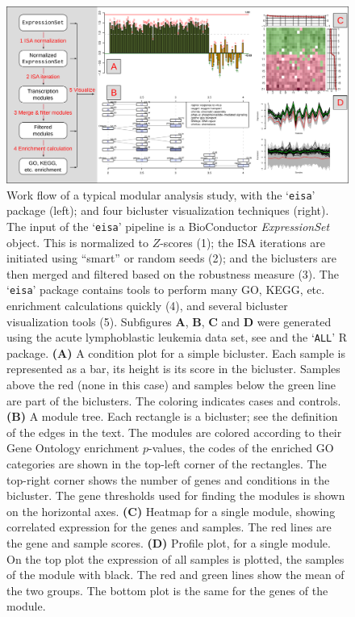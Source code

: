 \documentclass{bioinfo}
\newcommand{\Rpackage}[1]{`\texttt{#1}'}
\newcommand{\Rclass}[1]{\textsl{#1}}
\newcommand{\subfig}[1]{\textbf{#1}}
\begin{document}
\begin{figure}
\centering
\includegraphics[width=\textwidth]{isa2workflow3}
\caption{Work flow of a typical modular analysis study, with the
  \Rpackage{eisa} package (left); and four bicluster visualization
  techniques (right). The input of the \Rpackage{eisa} pipeline is a
  BioConductor \Rclass{ExpressionSet} object. This is normalized to
  $Z$-scores (1); the ISA iterations are initiated using ``smart'' or
  random seeds (2); and the biclusters are then merged and filtered
  based on the robustness measure (3). The \Rpackage{eisa} package
  contains tools to perform many GO, KEGG, etc. enrichment calculations
  quickly (4), and several bicluster visualization tools (5).
  Subfigures \subfig{A}, \subfig{B}, \subfig{C} and \subfig{D} were
generated
  using the acute lymphoblastic leukemia data set, see
  \citep{chiaretti04} and the \Rpackage{ALL} R package.
  \subfig{(A)} A condition plot for a simple bicluster. Each sample is
  represented as a bar, its height is its score in the bicluster.
  Samples above the red (none in this case) and samples
  below the green line are part of the biclusters. The coloring
  indicates cases and controls.
  \subfig{(B)} A module tree. Each rectangle is a bicluster; see the
  definition of the edges in the text. The modules are colored
  according to their Gene Ontology enrichment $p$-values, the codes of
  the enriched GO categories are shown in the top-left corner of the
  rectangles. The top-right corner shows the number of genes and
  conditions in the bicluster. The gene thresholds used for finding
  the modules is shown on the horizontal axes.
  \subfig{(C)} Heatmap for a single module, showing correlated
  expression for the genes and samples. The red lines are the gene and
  sample scores.
  \subfig{(D)} Profile plot, for a single module. On the top plot the
  expression of all samples is plotted, the samples of the module
  with black. The red and green lines show the mean of the two
  groups. The bottom plot is the same for the genes of the module.
}
\label{fig:workflow}
\end{figure}
\end{document}
